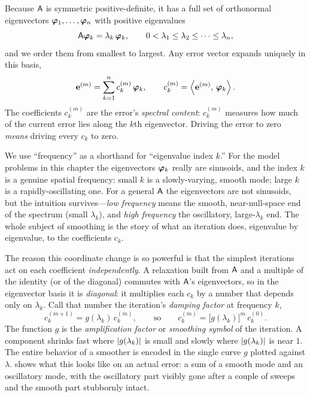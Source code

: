 Because $\mathsf{A}$ is symmetric positive-definite, it has a full set of orthonormal
eigenvectors $\boldsymbol{\varphi}_1,\dots,\boldsymbol{\varphi}_n$ with positive eigenvalues
\begin{equation}
  \mathsf{A}\boldsymbol{\varphi}_k = \lambda_k\,\boldsymbol{\varphi}_k,
  \qquad 0 < \lambda_1 \le \lambda_2 \le \dots \le \lambda_n,
  \label{eq:smoo-eig}
\end{equation}
and we order them from smallest to largest. Any error vector expands uniquely in
this basis,
\begin{equation}
  \mathbf{e}^{(m)} = \sum_{k=1}^{n} c_k^{(m)}\,\boldsymbol{\varphi}_k,
  \qquad c_k^{(m)} = \left\langle \mathbf{e}^{(m)},\, \boldsymbol{\varphi}_k\right\rangle.
  \label{eq:smoo-expand}
\end{equation}
The coefficients $c_k^{(m)}$ are the error's \emph{spectral content}: $c_k^{(m)}$
measures how much of the current error lies along the $k$th eigenvector. Driving
the error to zero \emph{means} driving every $c_k$ to zero.

\begin{notationbox}
We use ``frequency'' as a shorthand for ``eigenvalue index $k$.'' For the model
problems in this chapter the eigenvectors $\boldsymbol{\varphi}_k$ really are sinusoids, and the
index $k$ is a genuine spatial frequency: small $k$ is a slowly-varying, smooth
mode; large $k$ is a rapidly-oscillating one. For a general $\mathsf{A}$ the
eigenvectors are not sinusoids, but the intuition survives---\emph{low frequency}
means the smooth, near-null-space end of the spectrum (small $\lambda_k$), and
\emph{high frequency} the oscillatory, large-$\lambda_k$ end. The whole subject of
smoothing is the story of what an iteration does, eigenvalue by eigenvalue, to the
coefficients $c_k$.
\end{notationbox}

The reason this coordinate change is so powerful is that the simplest iterations
act on each coefficient \emph{independently}. A relaxation built from $\mathsf{A}$ and
a multiple of the identity (or of the diagonal) commutes with $\mathsf{A}$'s
eigenvectors, so in the eigenvector basis it is \emph{diagonal}: it multiplies each
$c_k$ by a number that depends only on $\lambda_k$. Call that number the
iteration's \emph{damping factor} at frequency $k$,
\begin{equation}
  c_k^{(m+1)} = g(\lambda_k)\, c_k^{(m)},
  \qquad\text{so}\qquad
  c_k^{(m)} = \bigl[g(\lambda_k)\bigr]^{m}\, c_k^{(0)}.
  \label{eq:smoo-damping}
\end{equation}
The function $g$ is the \emph{amplification factor} or \emph{smoothing symbol} of
the iteration. A component shrinks fast where $\lvert g(\lambda_k)\rvert$ is small and
slowly where $\lvert g(\lambda_k)\rvert$ is near $1$. The entire behavior of a smoother is
encoded in the single curve $g$ plotted against $\lambda$. 
shows what this looks like on an actual error: a sum of a smooth mode and an
oscillatory mode, with the oscillatory part visibly gone after a couple of sweeps
and the smooth part stubbornly intact.

